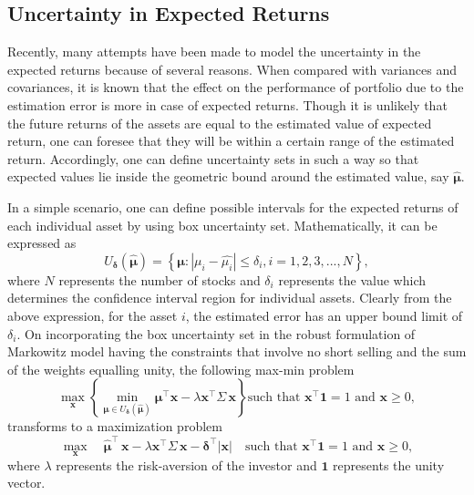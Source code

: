 \subsection{Uncertainty in Expected Returns}
Recently, many attempts have been made to model the uncertainty in the expected returns because of several reasons. When compared with variances and covariances, it is known that the effect on the performance of portfolio due to the estimation error is more in case of expected returns. Though it is unlikely that the future returns of the assets are equal to the estimated value of expected return, one can foresee that they will be within a certain range of the estimated return. Accordingly, one can define uncertainty sets in such a way so that expected values lie inside the geometric bound around the estimated value, say $\boldsymbol{\hat{\mu}}$.

In a simple scenario, one can define possible intervals for the expected returns of each individual asset by using box uncertainty set. Mathematically, it can be expressed as 
\begin{equation}
U_{\boldsymbol{\delta}}(\boldsymbol{\hat{\mu}}) = \left\{ \boldsymbol{\mu}: | \mu_i - \hat{\mu_i}| \leq \delta_i, i = 1,2,3,...,N \right\},    
\end{equation}
where $N$ represents the number of stocks and $\delta_i$ represents the value which determines the confidence interval region for individual assets. Clearly from the above expression, for the asset $i$, the estimated error has an upper bound limit of $\delta_i$. On incorporating the box uncertainty set in the robust formulation of Markowitz model having the constraints that involve no short selling and the sum of the weights equalling unity, the following max-min problem 
\begin{equation}
\label{eq:rf}
\max_{\mathbf{x}} \left\{ \min_{\boldsymbol{\mu} \in U_{\boldsymbol{\delta}}(\boldsymbol{\hat{\mu}})} \boldsymbol{\mu}^{\top} \mathbf{x} - \lambda \mathbf{x^{\top}}\Sigma \, \mathbf{x} \right\} \text{such that } \mathbf{x^{\top}}\mathbf{1}  = 1 \text{ and } \mathbf{x} \geq 0, 
\end{equation}
transforms to a maximization problem
\begin{equation}
\label{eqn:trans_eqn_box}
\max_\mathbf{x} \quad \boldsymbol{\hat{\mu}}^{\top} \, \mathbf{x}-  \lambda \mathbf{x^{\top}}\Sigma \, \mathbf{x} - \boldsymbol{\delta}^{\top}|\mathbf{x}| \quad \text{such that } \mathbf{x^{\top}}\mathbf{1}  = 1 \text{ and } \mathbf{x} \geq 0,  
\end{equation}
where $\lambda$ represents the risk-aversion of the investor and $\mathbf{1}$ represents the unity vector.

